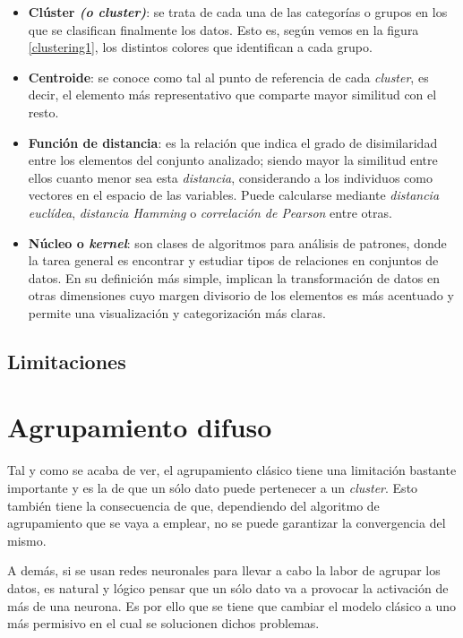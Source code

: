 \documentclass[]{report}
\begin{document}
			\begin{itemize}
				\item \textbf{Clúster \textit{(o cluster)}}: se trata de cada una de las categorías o grupos en los que se clasifican finalmente los datos. Esto es, según vemos en la figura \ref{clustering1}, los distintos colores que identifican a cada grupo.
				\item \textbf{Centroide}: se conoce como tal al punto de referencia de cada \textit{cluster}, es decir, el elemento más representativo que comparte mayor similitud con el resto.
				\item \textbf{Función de distancia}: es la relación que indica el grado de disimilaridad entre los elementos del conjunto analizado; siendo mayor la similitud entre ellos cuanto menor sea esta \textit{distancia}, considerando a los individuos como vectores en el espacio de las variables. Puede calcularse mediante \textit{distancia euclídea}, \textit{distancia Hamming} o \textit{correlación de Pearson} entre otras.
				\item \textbf{Núcleo o \textit{kernel}}: son clases de algoritmos para análisis de patrones, donde la tarea general es encontrar y estudiar tipos de relaciones en conjuntos de datos. En su definición más simple, implican la transformación de datos en otras dimensiones cuyo margen divisorio de los elementos es más acentuado y permite una visualización y categorización más claras.
			\end{itemize}
		
		\section{Limitaciones}
	
	\chapter{Agrupamiento difuso}
		Tal y como se acaba de ver, el agrupamiento clásico tiene una limitación bastante importante y es la de que un sólo dato puede pertenecer a un \textit{cluster}. Esto también tiene la consecuencia de que, dependiendo del algoritmo de agrupamiento que se vaya a emplear, no se puede garantizar la convergencia del mismo.
		
		A demás, si se usan redes neuronales para llevar a cabo la labor de agrupar los datos, es natural y lógico pensar que un sólo dato va a provocar la activación de más de una neurona. Es por ello que se tiene que cambiar el modelo clásico a uno más permisivo en el cual se solucionen dichos problemas.
			
\end{document}
